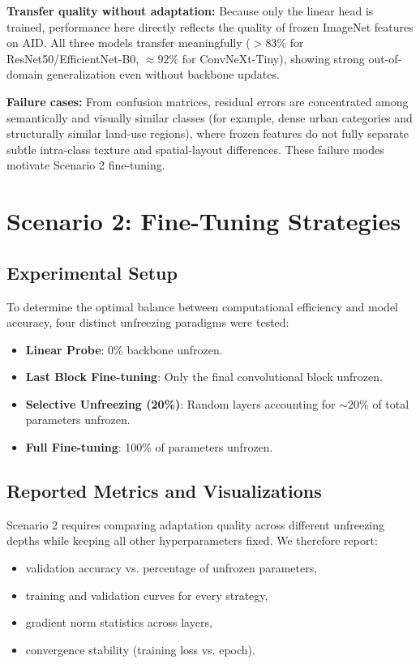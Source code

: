 \documentclass[12pt,a4paper]{article}
\begin{document}
\textbf{Transfer quality without adaptation:}
Because only the linear head is trained, performance here directly reflects the quality of frozen ImageNet features on AID. All three models transfer meaningfully (\(>83\%\) for ResNet50/EfficientNet-B0, \(\approx92\%\) for ConvNeXt-Tiny), showing strong out-of-domain generalization even without backbone updates.

\textbf{Failure cases:}
From confusion matrices, residual errors are concentrated among semantically and visually similar classes (for example, dense urban categories and structurally similar land-use regions), where frozen features do not fully separate subtle intra-class texture and spatial-layout differences. These failure modes motivate Scenario 2 fine-tuning.

\section{Scenario 2: Fine-Tuning Strategies}
\label{sec:scenario2}

\subsection{Experimental Setup}
To determine the optimal balance between computational efficiency and model accuracy, four distinct unfreezing paradigms were tested:
\begin{itemize}[nosep]
    \item \textbf{Linear Probe}: 0\% backbone unfrozen.
    \item \textbf{Last Block Fine-tuning}: Only the final convolutional block unfrozen.
    \item \textbf{Selective Unfreezing (20\%)}: Random layers accounting for $\sim$20\% of total parameters unfrozen.
    \item \textbf{Full Fine-tuning}: 100\% of parameters unfrozen.
\end{itemize}

\subsection{Reported Metrics and Visualizations}
Scenario 2 requires comparing adaptation quality across different unfreezing depths while keeping all other hyperparameters fixed. We therefore report:
\begin{itemize}[nosep]
    \item validation accuracy vs. percentage of unfrozen parameters,
    \item training and validation curves for every strategy,
    \item gradient norm statistics across layers,
    \item convergence stability (training loss vs. epoch).
\end{itemize}
\end{document}
